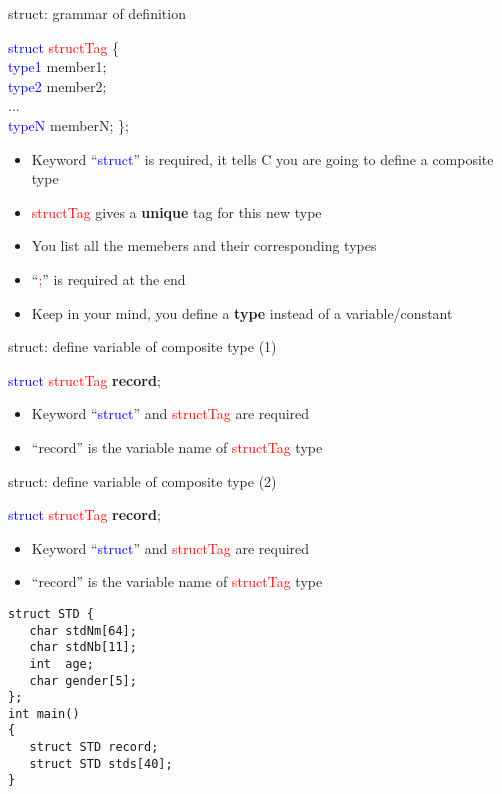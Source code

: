 \begin{frame}[fragile]{struct: grammar of definition}
\begin{center}
	\Large{
	\textcolor{blue}{struct} \textcolor{red}{structTag} \{ \\
	  \textcolor{blue}{type1} member1; \\
	  \textcolor{blue}{type2} member2; \\
	   ... \\
	  \textcolor{blue}{typeN} memberN; \};
	}
\end{center}
\begin{itemize}
	\item {Keyword ``\textcolor{blue}{struct}'' is required, it tells C you are going to define a composite type}
	\item {\textcolor{red}{structTag} gives a \textbf{unique} tag for this new type}
	\item {You list all the memebers and their corresponding types}
	\item {``\textcolor{red}{;}'' is required at the end}
	\item {Keep in your mind, you define a \textbf{type} instead of a variable/constant}
\end{itemize}
\end{frame}

\begin{frame}[fragile]{struct: define variable of composite type (1)}
\begin{center}
	\Large{
	\textcolor{blue}{struct} \textcolor{red}{structTag} \textbf{record};
	}
\end{center}
\begin{itemize}
	\item {Keyword ``\textcolor{blue}{struct}''  and \textcolor{red}{structTag} are required}
	\item {``record'' is the variable name of \textcolor{red}{structTag} type}
\end{itemize}
\end{frame}

\begin{frame}[fragile]{struct: define variable of composite type (2)}
\begin{center}
	\Large{
	\textcolor{blue}{struct} \textcolor{red}{structTag} \textbf{record};
	}
\end{center}
\begin{itemize}
	\item {Keyword ``\textcolor{blue}{struct}''  and \textcolor{red}{structTag} are required}
	\item {``record'' is the variable name of \textcolor{red}{structTag} type}
\end{itemize}
\begin{lstlisting}
struct STD {
   char stdNm[64];
   char stdNb[11];
   int  age;
   char gender[5];
};
int main()
{
   struct STD record;
   struct STD stds[40];
}
\end{lstlisting}
\end{frame}

